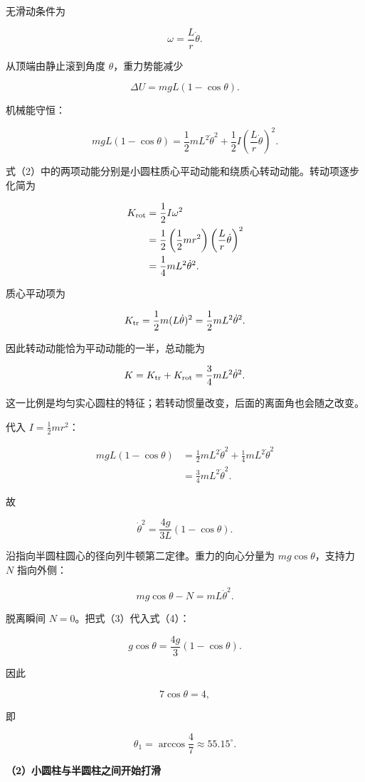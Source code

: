 \documentclass[12pt,a4paper,UTF8]{ctexart}
\begin{document}
无滑动条件为

\[\omega=\frac{L}{r}\dot\theta. \tag{1}\]

从顶端由静止滚到角度 \(\theta\)，重力势能减少

\[\Delta U=mgL(1-\cos\theta).\]

机械能守恒：

\[mgL(1-\cos\theta)
=\frac12mL^2\dot\theta^2
+\frac12I\left(\frac{L}{r}\dot\theta\right)^2. \tag{2}\]

式（2）中的两项动能分别是小圆柱质心平动动能和绕质心转动动能。转动项逐步化简为

\[\begin{aligned}
K_{\rm rot}
&=\frac12I\omega^2\\
&=\frac12\left(\frac12mr^2\right)
\left(\frac{L}{r}\dot\theta\right)^2\\
&=\frac14mL^2\dot\theta^2.
\end{aligned}\]

质心平动项为

\[K_{\rm tr}=\frac12m(L\dot\theta)^2
=\frac12mL^2\dot\theta^2.\]

因此转动动能恰为平动动能的一半，总动能为

\[K=K_{\rm tr}+K_{\rm rot}
=\frac34mL^2\dot\theta^2.\]

这一比例是均匀实心圆柱的特征；若转动惯量改变，后面的离面角也会随之改变。

代入 \(I=\frac12mr^2\)：

\[\begin{aligned}
mgL(1-\cos\theta)
&=\frac12mL^2\dot\theta^2
+\frac14mL^2\dot\theta^2\\
&=\frac34mL^2\dot\theta^2.
\end{aligned}\]

故

\[\dot\theta^2=\frac{4g}{3L}(1-\cos\theta). \tag{3}\]

沿指向半圆柱圆心的径向列牛顿第二定律。重力的向心分量为
\(mg\cos\theta\)，支持力 \(N\) 指向外侧：

\[mg\cos\theta-N=mL\dot\theta^2. \tag{4}\]

脱离瞬间 \(N=0\)。把式（3）代入式（4）：

\[g\cos\theta=\frac{4g}{3}(1-\cos\theta).\]

因此

\[7\cos\theta=4,\]

即

\[\boxed{\theta_1=\arccos\frac47\approx55.15^\circ}. \tag{5}\]

\textbf{（2）小圆柱与半圆柱之间开始打滑}
\end{document}

